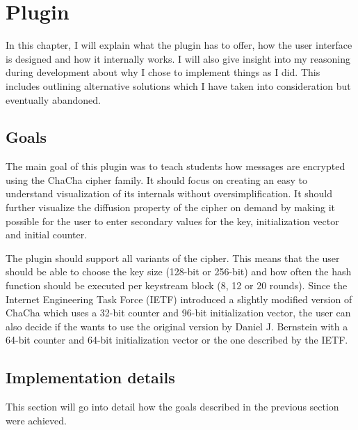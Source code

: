%

\chapter{Plugin}
\label{chap:Plugin}

In this chapter, I will explain what the plugin has to offer, how the user interface is designed and how it internally works. I will also give insight into my reasoning during development about why I chose to implement things as I did. This includes outlining alternative solutions which I have taken into consideration but eventually abandoned.

\section{Goals}
\label{sec:goals}

The main goal of this plugin was to teach students how messages are encrypted using the ChaCha cipher family. It should focus on creating an easy to understand visualization of its internals without oversimplification.
It should further visualize the diffusion property of the cipher on demand by making it possible for the user to enter secondary values for the key, initialization vector and initial counter.

The plugin should support all variants of the cipher. This means that the user should be able to choose the key size (128-bit or 256-bit) and how often the hash function should be executed per keystream block (8, 12 or 20 rounds). 
Since the Internet Engineering Task Force (IETF) introduced a slightly modified version of ChaCha which uses a 32-bit counter and 96-bit initialization vector, the user can also decide if the wants to use the original version by Daniel J. Bernstein with a 64-bit counter and 64-bit initialization vector or the one described by the IETF.

\section{Implementation details}
\label{sec:implementationDetails}

This section will go into detail how the goals described in the previous section were achieved.

\par

